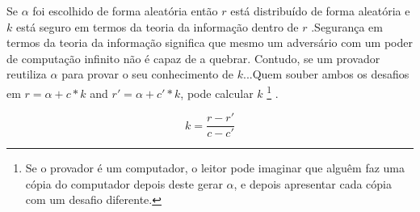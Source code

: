 \begin{enumerate}
Se $\alpha$ foi escolhido de forma aleatória então $r$ está distribuído de forma aleatória \cite{SCOZZAFAVA1993313} e $k$ está seguro em termos da teoria da informação dentro de $r$ .\newline Segurança em termos da teoria da informação significa que mesmo um adversário com um poder de computação infinito não é capaz de a quebrar. 
Contudo, se um provador reutiliza $\alpha$ para provar o seu conhecimento de $k$...\newline Quem souber ambos os desafios em $r = \alpha + c*k$ and $r' = \alpha + c'*k$, pode calcular $k$ \footnote{Se o provador é um computador, o leitor pode imaginar que alguêm faz uma cópia do computador depois deste gerar $\alpha$, e depois apresentar cada cópia com um desafio diferente.} 
.  

\vspace{.175cm}%
\[k = \frac{r-r'}{c-c'}\]



\end{enumerate}
